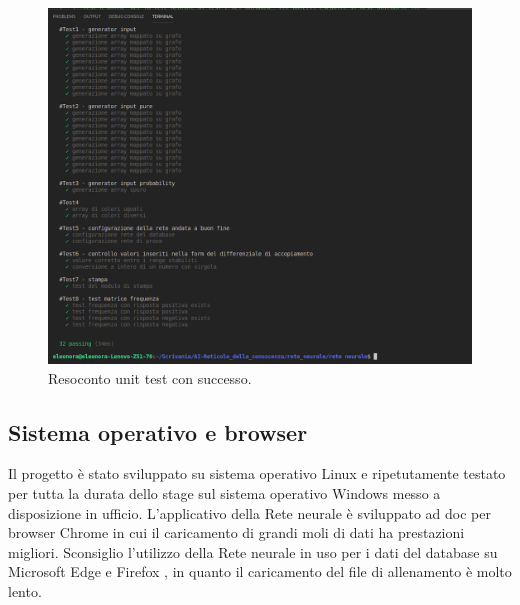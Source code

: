 \begin{figure}[H]
\centering
	\includegraphics[width=0.80\linewidth]{./image/recap_test.png}
	\caption{Resoconto unit test con successo.}
	\label{Resoconto unit test con successo.}
\end{figure}
\noindent

\subsection{Sistema operativo e browser}
Il progetto \`e stato sviluppato su sistema operativo Linux e ripetutamente testato per tutta la durata dello stage sul sistema operativo Windows messo a disposizione in ufficio. L'applicativo della Rete neurale \`e sviluppato ad doc per browser Chrome in cui il caricamento di grandi moli di dati ha prestazioni migliori. Sconsiglio l'utilizzo della Rete neurale in uso per i dati del database su Microsoft Edge e Firefox , in quanto il caricamento del file di allenamento \`e molto lento.

